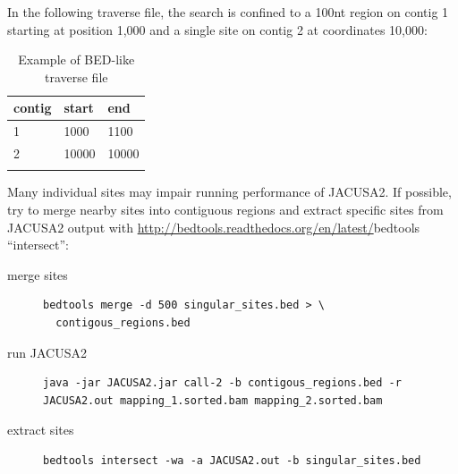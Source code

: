 \documentclass[10pt,a4paper]{article}
\begin{document}
In the following traverse file, the search is confined to a 100nt region on contig 1
starting at position 1,000 and a single site on contig 2 at coordinates 10,000:
\begin{table}
\centering
\caption{Example of BED-like traverse file}
\label{tb:traverse_file}
\begin{tabular}{lll}
\textbf{contig} & \textbf{start} & \textbf{end} \\
\hline
1 & 1000 & 1100 \\
2 & 10000 & 10000 \\
\multicolumn{3}{c}{}
\end{tabular}
\end{table}
Many individual sites may impair running performance of JACUSA2.
If possible, try to merge nearby sites into contiguous regions and extract specific sites from 
JACUSA2 output with \url{http://bedtools.readthedocs.org/en/latest/}{bedtools} ``intersect'':
\begin{description}
\item[merge sites] \begin{verbatim} 
bedtools merge -d 500 singular_sites.bed > \ 
  contigous_regions.bed
\end{verbatim}
\item[run JACUSA2] \begin{verbatim} 
java -jar JACUSA2.jar call-2 -b contigous_regions.bed -r
JACUSA2.out mapping_1.sorted.bam mapping_2.sorted.bam
\end{verbatim}
\item[extract sites] \begin{verbatim}
bedtools intersect -wa -a JACUSA2.out -b singular_sites.bed
\end{verbatim}
\end{description}
\end{document}
